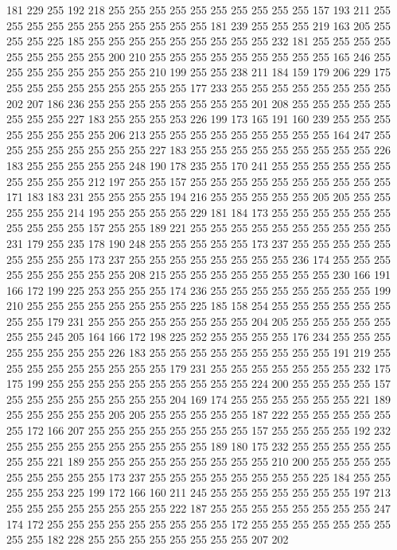 181 229 255 192 218 255 255 255 255 255 255 255 255 255 255 157 193 211 255 255
255 255 255 255 255 255 255 255 255 181 239 255 255 255 219 163 205 255 255 255
225 185 255 255 255 255 255 255 255 255 255 232 181 255 255 255 255 255 255 255
255 255 200 210 255 255 255 255 255 255 255 255 255 165 246 255 255 255 255 255
255 255 255 210 199 255 255 238 211 184 159 179 206 229 175 255 255 255 255 255
255 255 255 255 177 233 255 255 255 255 255 255 255 255 202 207 186 236 255 255
255 255 255 255 255 255 201 208 255 255 255 255 255 255 255 255 227 183 255 255
255 253 226 199 173 165 191 160 239 255 255 255 255 255 255 255 255 206 213 255
255 255 255 255 255 255 255 255 164 247 255 255 255 255 255 255 255 255 227 183
255 255 255 255 255 255 255 255 255 226 183 255 255 255 255 255 248 190 178 235
255 170 241 255 255 255 255 255 255 255 255 255 255 212 197 255 255 157 255 255
255 255 255 255 255 255 255 255 171 183 183 231 255 255 255 255 194 216 255 255
255 255 255 205 205 255 255 255 255 255 214 195 255 255 255 255 229 181 184 173
255 255 255 255 255 255 255 255 255 255 157 255 255 189 221 255 255 255 255 255
255 255 255 255 255 231 179 255 235 178 190 248 255 255 255 255 255 173 237 255
255 255 255 255 255 255 255 255 173 237 255 255 255 255 255 255 255 255 236 174
255 255 255 255 255 255 255 255 255 208 215 255 255 255 255 255 255 255 255 230
166 191 166 172 199 225 253 255 255 255 174 236 255 255 255 255 255 255 255 255
199 210 255 255 255 255 255 255 255 255 225 185 158 254 255 255 255 255 255 255
255 255 179 231 255 255 255 255 255 255 255 255 204 205 255 255 255 255 255 255
255 245 205 164 166 172 198 225 252 255 255 255 255 176 234 255 255 255 255 255
255 255 255 226 183 255 255 255 255 255 255 255 255 255 191 219 255 255 255 255
255 255 255 255 255 179 231 255 255 255 255 255 255 255 232 175 175 199 255 255
255 255 255 255 255 255 255 255 224 200 255 255 255 255 157 255 255 255 255 255
255 255 255 204 169 174 255 255 255 255 255 255 221 189 255 255 255 255 255 205
205 255 255 255 255 255 187 222 255 255 255 255 255 255 172 166 207 255 255 255
255 255 255 255 255 157 255 255 255 255 192 232 255 255 255 255 255 255 255 255
255 255 189 180 175 232 255 255 255 255 255 255 255 221 189 255 255 255 255 255
255 255 255 255 210 200 255 255 255 255 255 255 255 255 255 173 237 255 255 255
255 255 255 255 255 225 184 255 255 255 255 253 225 199 172 166 160 211 245 255
255 255 255 255 255 255 197 213 255 255 255 255 255 255 255 255 222 187 255 255
255 255 255 255 255 255 247 174 172 255 255 255 255 255 255 255 255 255 172 255
255 255 255 255 255 255 255 255 182 228 255 255 255 255 255 255 255 255 207 202
